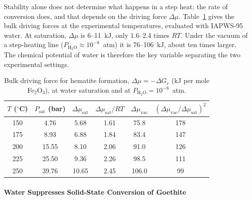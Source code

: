 Stability alone does not determine what happens in a step heat; the rate of conversion does,
and that depends on the driving force $\Delta\mu$. Table~\ref{tab:gt_dmu} gives the bulk driving
forces at the experimental temperatures, evaluated with IAPWS-95 water. At saturation,
$\Delta\mu$ is 6--11~kJ, only 1.6--2.4 times $RT$. Under the vacuum of a step-heating line
($P_{\mathrm{H_2O}}\approx10^{-8}$~atm) it is 76--106~kJ, about ten times larger. The chemical
potential of water is therefore the key variable separating the two experimental settings.

\begin{table}[htbp]
  \centering
  \caption{Bulk driving force for hematite formation, $\Delta\mu = -\Delta G_r$ (kJ per mole Fe$_2$O$_3$), at water saturation and at $P_{\mathrm{H_2O}} = 10^{-8}$~atm.}
  \label{tab:gt_dmu}
  \begin{tabular}{cccccc}
    \hline
    $T$ ($^\circ$C) & $P_{\mathrm{sat}}$ (bar) & $\Delta\mu_{\mathrm{sat}}$ & $\Delta\mu_{\mathrm{sat}}/RT$ & $\Delta\mu_{\mathrm{vac}}$ & $(\Delta\mu_{\mathrm{vac}}/\Delta\mu_{\mathrm{sat}})^2$ \\
    \hline
    150 & 4.76  & 5.68  & 1.61 & 75.8  & 178 \\
    175 & 8.93  & 6.88  & 1.84 & 83.4  & 147 \\
    200 & 15.55 & 8.10  & 2.06 & 91.0  & 126 \\
    225 & 25.50 & 9.36  & 2.26 & 98.5  & 111 \\
    250 & 39.76 & 10.65 & 2.45 & 106.0 & 99  \\
    \hline
  \end{tabular}
\end{table}

\paragraph{Water Suppresses Solid-State Conversion of Goethite}\label{sec:gt_nucleation}

